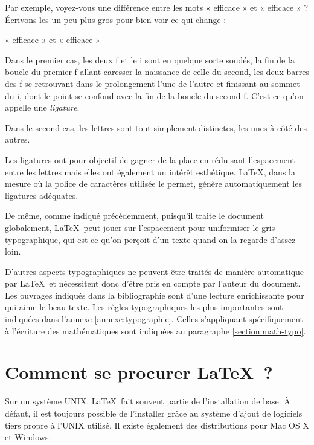 \documentclass[a4paper,11pt,openbib]{book}
\newcommand{\terme}[1]{\emph{#1}\index{#1}}
\begin{document}
Par exemple, voyez-vous une différence entre les mots « efficace » et
« ef{}f{}icace » ? Écrivons-les un peu plus gros pour bien voir ce qui change :

\begin{framed}
\begin{center}
\Huge
« efficace » et « ef{}f{}icace »
\end{center}
\end{framed}

Dans le premier cas, les deux f et le i sont en quelque sorte soudés, la fin de
la boucle du premier f allant caresser la naissance de celle du second, les deux
barres des f se retrouvant dans le prolongement l'une de l'autre et finissant au
sommet du i, dont le point se confond avec la fin de la boucle du second f.
C'est ce qu'on appelle une \terme{ligature}.

Dans le second cas, les lettres sont tout simplement distinctes, les unes à côté
des autres.

Les ligatures ont pour objectif de gagner de la place en réduisant l'espacement
entre les lettres mais elles ont également un intérêt esthétique. \LaTeX, dans
la mesure où la police de caractères utilisée le permet, génère automatiquement
les ligatures adéquates.

De même, comme indiqué précédemment, puisqu'il traite le document globalement,
\LaTeX\ peut jouer sur l'espacement pour uniformiser le gris typographique, qui
est ce qu'on perçoit d'un texte quand on la regarde d'assez loin.

D'autres aspects typographiques ne peuvent être traités de manière automatique
par \LaTeX\ et nécessitent donc d'être pris en compte par l'auteur du document.
Les ouvrages indiqués dans la bibliographie sont d'une lecture enrichissante
pour qui aime le beau texte. Les règles typographiques les plus importantes sont
indiquées dans l'annexe \ref{annexe:typographie}. Celles s'appliquant
spécifiquement à l'écriture des mathématiques sont indiquées au paragraphe
\ref{section:math-typo}.

\section{Comment se procurer \LaTeX\ ?}
\label{section:procurer}

Sur un système UNIX, \LaTeX\ fait souvent partie de l'installation de base. À
défaut, il est toujours possible de l'installer grâce au système d'ajout de
logiciels tiers propre à l'UNIX utilisé. Il existe également des distributions
pour Mac OS X et Windows.
\end{document}
